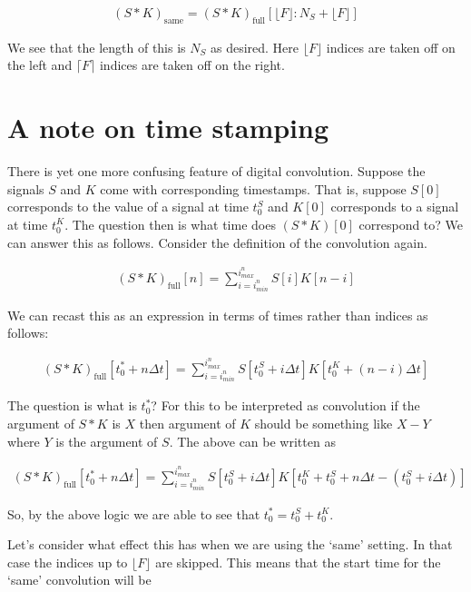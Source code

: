 \documentclass[12pt]{article}
\begin{document}
\begin{align}
(S\ast K)_{\text{same}} = (S\ast K)_{\text{full}}\left[\lfloor F\rfloor:N_S + \lfloor F \rfloor\right]
\end{align}

We see that the length of this is $N_S$ as desired. Here $\lfloor F \rfloor$ indices are taken off on the left and $\lceil F \rceil$ indices are taken off on the right.

\section{A note on time stamping}

There is yet one more confusing feature of digital convolution. Suppose the signals $S$ and $K$ come with corresponding timestamps. That is, suppose $S[0]$ corresponds to the value of a signal at time $t_0^S$ and $K[0]$ corresponds to a signal at time $t_0^K$. The question then is what time does $(S\ast K)[0]$ correspond to? We can answer this as follows. Consider the definition of the convolution again.

\begin{align}
(S \ast K)_{\text{full}}[n] = \sum_{i=i_{min}^n}^{i_{max}^n} S[i]K[n-i]
\end{align}

We can recast this as an expression in terms of times rather than indices as follows:

\begin{align}
(S\ast K)_{\text{full}}[t_0^* + n\Delta t] = \sum_{i=i_{min}^n}^{i_{max}^n} S[t_0^S + i \Delta t]K[t_0^K + (n-i)\Delta t]
\end{align}

The question is what is $t_0^*$? For this to be interpreted as convolution if the argument of $S\ast K$ is $X$ then argument of $K$ should be something like $X-Y$ where $Y$ is the argument of $S$. The above can be written as

\begin{align}
(S\ast K)_{\text{full}}[t_0^* + n\Delta t] = \sum_{i=i_{min}^n}^{i_{max}^n} S[t_0^S + i \Delta t]K[t_0^K + t_0^S + n\Delta t - (t_0^S + i\Delta t)]
\end{align}

So, by the above logic we are able to see that $t_0^* = t_0^S + t_0^K$. 

Let's consider what effect this has when we are using the `same' setting. In that case the indices up to $\lfloor F \rfloor$ are skipped. This means that the start time for the `same' convolution will be
\end{document}
